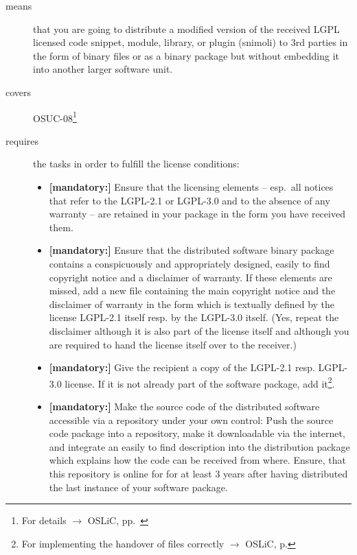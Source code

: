 \begin{description}
\item[means] that you are going to distribute a modified version of the received
LGPL licensed code snippet, module, library, or plugin (snimoli) to 3rd
parties in the form of binary files or as a binary package but without embedding
it into another larger software unit.
\item[covers] OSUC-08\footnote{For details $\rightarrow$ OSLiC, pp.\ \pageref{OSUC-08-DEF}}
\item[requires] the tasks in order to fulfill the license conditions:
\begin{itemize}

  \item \textbf{[mandatory:]} Ensure that the licensing elements -- esp.\ all
  notices that refer to the LGPL-2.1 or LGPL-3.0 and to the absence of any
  warranty -- are retained in your package in the form you have received them.

  \item \textbf{[mandatory:]} Ensure that the distributed software binary
  package contains a conspicuously and appropriately designed, easily to find
  copyright notice and a disclaimer of warranty. If these elements are missed,
  add a new file containing the main copyright notice and the disclaimer of
  warranty in the form which is textually defined by the license LGPL-2.1 itself
  resp. by the LGPL-3.0 itself. (Yes, repeat the disclaimer although it is also
  part of the license itself and although you are required to hand the license
  itself over to the receiver.)
  
  \item \textbf{[mandatory:]} Give the recipient a copy of the LGPL-2.1 resp.
  LGPL-3.0 license. If it is not already part of the software package, add
  it\footnote{For implementing the handover of files correctly $\rightarrow$
  OSLiC, p. \pageref{DistributingFilesHint}}.

  \item \textbf{[mandatory:]} Make the source code of the distributed software
  accessible via a repository under your own control: Push the source code
  package into a repository, make it downloadable via the internet, and
  integrate an easily to find description into the distribution package which
  explains how the code can be received from where. Ensure, that this repository
  is online for for at least 3 years after having distributed the last instance
  of your software package.
  

\end{itemize}
\end{description}
